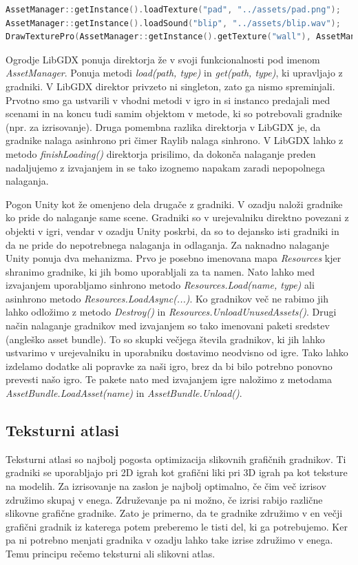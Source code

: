 \documentclass[12pt,a4paper,twoside]{book}
\begin{document}
\begin{lstlisting}[label=code:assetManager, language=C++, caption=Uporaba direktorja gradnikov]
AssetManager::getInstance().loadTexture("pad", "../assets/pad.png");
AssetManager::getInstance().loadSound("blip", "../assets/blip.wav");
DrawTexturePro(AssetManager::getInstance().getTexture("wall"), AssetManager::getInstance().getRectangle("wall"), renderRectangle, Vector2{0, 0}, 0, BLUE);
\end{lstlisting}

Ogrodje LibGDX ponuja direktorja že v svoji funkcionalnosti pod imenom \textit{AssetManager}. Ponuja metodi \textit{load(path, type)} in \textit{get(path, type)}, ki upravljajo z gradniki. V LibGDX direktor privzeto ni singleton, zato ga nismo spreminjali. Prvotno smo ga ustvarili v vhodni metodi v igro in si instanco predajali med scenami in na koncu tudi samim objektom v metode, ki so potrebovali gradnike (npr. za izrisovanje). Druga pomembna razlika direktorja v LibGDX je, da gradnike nalaga asinhrono pri čimer Raylib nalaga sinhrono. V LibGDX lahko z metodo \textit{finishLoading()} direktorja prisilimo, da dokonča nalaganje preden nadaljujemo z izvajanjem in se tako izognemo napakam zaradi nepopolnega nalaganja.

Pogon Unity kot že omenjeno dela drugače z gradniki. V ozadju naloži gradnike ko pride do nalaganje same scene. Gradniki so v urejevalniku direktno povezani z objekti v igri, vendar v ozadju Unity poskrbi, da so to dejansko isti gradniki in da ne pride do nepotrebnega nalaganja in odlaganja. Za naknadno nalaganje Unity ponuja dva mehanizma. Prvo je posebno imenovana mapa \textit{Resources} kjer shranimo gradnike, ki jih bomo uporabljali za ta namen. Nato lahko med izvajanjem uporabljamo sinhrono metodo \textit{Resources.Load(name, type)} ali asinhrono metodo \textit{Resources.LoadAsync(...)}. Ko gradnikov več ne rabimo jih lahko odložimo z metodo \textit{Destroy()} in \textit{Resources.UnloadUnusedAssets()}. Drugi način nalaganje gradnikov med izvajanjem so tako imenovani paketi sredstev (angleško asset bundle). To so skupki večjega števila gradnikov, ki jih lahko ustvarimo v urejevalniku in uporabniku dostavimo neodvisno od igre. Tako lahko izdelamo dodatke ali popravke za naši igro, brez da bi bilo potrebno ponovno prevesti našo igro. Te pakete nato med izvajanjem igre naložimo z metodama \textit{AssetBundle.LoadAsset(name)} in \textit{AssetBundle.Unload()}. 

\subsection{Teksturni atlasi}
Teksturni atlasi so najbolj pogosta optimizacija slikovnih grafičnih gradnikov. Ti gradniki se uporabljajo pri 2D igrah kot grafični liki pri 3D igrah pa kot teksture na modelih. Za izrisovanje na zaslon je najbolj optimalno, če čim več izrisov združimo skupaj v enega. Združevanje pa ni možno, če izrisi rabijo različne slikovne grafične gradnike. Zato je primerno, da te gradnike združimo v en večji grafični gradnik iz katerega potem preberemo le tisti del, ki ga potrebujemo. Ker pa ni potrebno menjati gradnika v ozadju lahko take izrise združimo v enega. Temu principu rečemo teksturni ali slikovni atlas.
\end{document}
